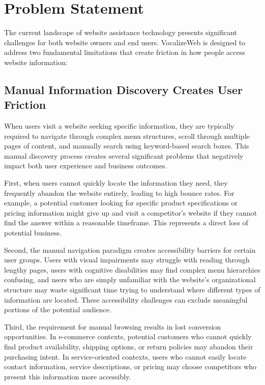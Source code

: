 \section{Problem Statement}

The current landscape of website assistance technology presents significant challenges for both website owners and end users. VocalizeWeb is designed to address two fundamental limitations that create friction in how people access website information:

\subsection{Manual Information Discovery Creates User Friction}

When users visit a website seeking specific information, they are typically required to navigate through complex menu structures, scroll through multiple pages of content, and manually search using keyword-based search boxes. This manual discovery process creates several significant problems that negatively impact both user experience and business outcomes.

First, when users cannot quickly locate the information they need, they frequently abandon the website entirely, leading to high bounce rates. For example, a potential customer looking for specific product specifications or pricing information might give up and visit a competitor's website if they cannot find the answer within a reasonable timeframe. This represents a direct loss of potential business.

Second, the manual navigation paradigm creates accessibility barriers for certain user groups. Users with visual impairments may struggle with reading through lengthy pages, users with cognitive disabilities may find complex menu hierarchies confusing, and users who are simply unfamiliar with the website's organizational structure may waste significant time trying to understand where different types of information are located. These accessibility challenges can exclude meaningful portions of the potential audience.

Third, the requirement for manual browsing results in lost conversion opportunities. In e-commerce contexts, potential customers who cannot quickly find product availability, shipping options, or return policies may abandon their purchasing intent. In service-oriented contexts, users who cannot easily locate contact information, service descriptions, or pricing may choose competitors who present this information more accessibly.


